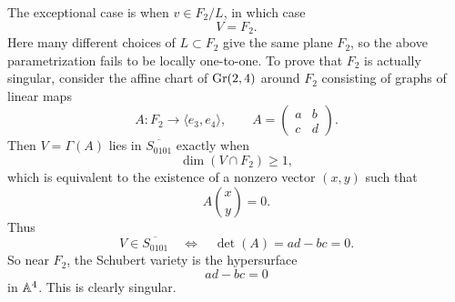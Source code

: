 \documentclass[12pt]{article}  %
\begin{document}
\begin{solution}
\begin{enumerate}
The exceptional case is when \(v\in F_2/L\), in which case
\[
V=F_2.
\]
Here many different choices of \(L\subset F_2\) give the same plane \(F_2\), so the above parametrization fails to be locally one-to-one. 
To prove that \(F_2\) is actually singular, consider the affine chart of \(\operatorname{Gr}(2,4)\) around \(F_2\) consisting of graphs of linear maps
\[
A:F_2\to \langle e_3,e_4\rangle,
\qquad
A=\begin{pmatrix} a&b\\ c&d\end{pmatrix}.
\]
Then \(V=\Gamma(A)\) lies in \(\overline{S_{0101}}\) exactly when
\[
\dim(V\cap F_2)\ge 1,
\]
which is equivalent to the existence of a nonzero vector \((x,y)\) such that
\[
A\binom{x}{y}=0.
\]
Thus
\[
V\in \overline{S_{0101}}
\quad\Longleftrightarrow\quad
\det(A)=ad-bc=0.
\]
So near \(F_2\), the Schubert variety is the hypersurface
\[
ad-bc=0
\]
in \(\mathbb{A}^4\). This is clearly singular.
\end{enumerate}
\end{solution}
\end{document}
